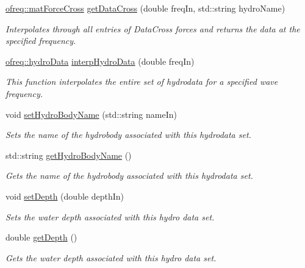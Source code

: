 \begin{DoxyCompactItemize}
\hyperlink{classosea_1_1ofreq_1_1mat_force_cross}{ofreq\-::mat\-Force\-Cross} \hyperlink{classosea_1_1ofreq_1_1hydro_data_a3d5957ba04d7757eccf8ed6d000db74e}{get\-Data\-Cross} (double freq\-In, std\-::string hydro\-Name)
\begin{DoxyCompactList}\small\item\em Interpolates through all entries of Data\-Cross forces and returns the data at the specified frequency. \end{DoxyCompactList}\item 
\hyperlink{classosea_1_1ofreq_1_1hydro_data}{ofreq\-::hydro\-Data} \hyperlink{classosea_1_1ofreq_1_1hydro_data_a3bc82090ad80f7830ec396283ca71ab9}{interp\-Hydro\-Data} (double freq\-In)
\begin{DoxyCompactList}\small\item\em This function interpolates the entire set of hydrodata for a specified wave frequency. \end{DoxyCompactList}\item 
void \hyperlink{classosea_1_1ofreq_1_1hydro_data_aa1c4974a084743be77818856bebe48c8}{set\-Hydro\-Body\-Name} (std\-::string name\-In)
\begin{DoxyCompactList}\small\item\em Sets the name of the hydrobody associated with this hydrodata set. \end{DoxyCompactList}\item 
std\-::string \hyperlink{classosea_1_1ofreq_1_1hydro_data_abc0e62a5fd8f2c38ef6b6cbd27b4ef02}{get\-Hydro\-Body\-Name} ()
\begin{DoxyCompactList}\small\item\em Gets the name of the hydrobody associated with this hydrodata set. \end{DoxyCompactList}\item 
void \hyperlink{classosea_1_1ofreq_1_1hydro_data_a915529d0176e1201e72c1b2666d32b12}{set\-Depth} (double depth\-In)
\begin{DoxyCompactList}\small\item\em Sets the water depth associated with this hydro data set. \end{DoxyCompactList}\item 
double \hyperlink{classosea_1_1ofreq_1_1hydro_data_acd88cb104d1b7555836fafd48ab23b6d}{get\-Depth} ()
\begin{DoxyCompactList}\small\item\em Gets the water depth associated with this hydro data set. \end{DoxyCompactList}\item 

\end{DoxyCompactItemize}
